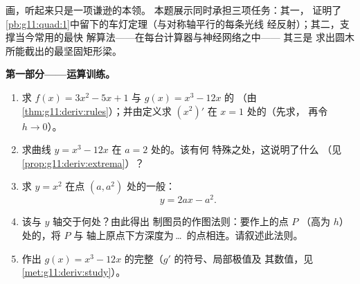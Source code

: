 \begin{problem}
\label{pb:g11:deriv:1}
画，听起来只是一项谦逊的本领。
本题展示同时承担三项任务：其一，
证明了
\cref{pb:g11:quad:1}中留下的车灯定理（与对称轴平行的每条光线
经反射）；其二，支撑当今常用的最快
解算法——在每台计算器与神经网络之中——
其三是
求出圆木所能截出的最坚固矩形梁。

\medskip
\noindent\textbf{第一部分——运算训练。}
\begin{enumerate}
  \item 求 $f(x) = 3x^2 - 5x + 1$ 与
        $g(x) = x^3 - 12x$ 的
        （由\cref{thm:g11:deriv:rules}）；并由定义求 $\left(x^2
        \right)'$ 在 $x = 1$ 处的（先求，
        再令 $h \to 0$）。
  \item 求曲线 $y = x^3 - 12x$ 在 $a = 2$ 处的。该有何
        特殊之处，这说明了什么
        （见\cref{prop:g11:deriv:extrema}）？
  \item 求 $y = x^2$
        在点 $(a, a^2)$ 处的一般：
        \[
        y = 2ax - a^2 .
        \]
  \item 该与 $y$ 轴交于何处？由此得出
        制图员的作图法则：要作上的点 $P$
        （高为 $h$）处的，将 $P$ 与
        轴上原点下方深度为\,\dots\ 的点相连。请叙述此法则。
  \item 作出
        $g(x) = x^3 - 12x$ 的完整（$g'$ 的符号、局部极值及
        其数值，见\cref{met:g11:deriv:study}）。
\end{enumerate}


\end{problem}
